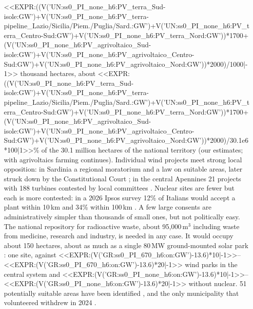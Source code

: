 <<EXPR:((V('UN:ss0_PI_none_h6:PV_terra_Sud-isole:GW')+V('UN:ss0_PI_none_h6:PV_terra-pipeline_Lazio/Sicilia/Piem./Puglia/Sard.:GW')+V('UN:ss0_PI_none_h6:PV_terra_Centro-Sud:GW')+V('UN:ss0_PI_none_h6:PV_terra_Nord:GW'))*1700+(V('UN:ss0_PI_none_h6:PV_agrivoltaico_Sud-isole:GW')+V('UN:ss0_PI_none_h6:PV_agrivoltaico_Centro-Sud:GW')+V('UN:ss0_PI_none_h6:PV_agrivoltaico_Nord:GW'))*2000)/1000|-1>> thousand hectares, about <<EXPR:((V('UN:ss0_PI_none_h6:PV_terra_Sud-isole:GW')+V('UN:ss0_PI_none_h6:PV_terra-pipeline_Lazio/Sicilia/Piem./Puglia/Sard.:GW')+V('UN:ss0_PI_none_h6:PV_terra_Centro-Sud:GW')+V('UN:ss0_PI_none_h6:PV_terra_Nord:GW'))*1700+(V('UN:ss0_PI_none_h6:PV_agrivoltaico_Sud-isole:GW')+V('UN:ss0_PI_none_h6:PV_agrivoltaico_Centro-Sud:GW')+V('UN:ss0_PI_none_h6:PV_agrivoltaico_Nord:GW'))*2000)/30.1e6*100|1>>\% of the 30.1 million hectares of the national territory (our estimates; with agrivoltaics farming continues). Individual wind projects meet strong local opposition: in Sardinia a regional moratorium and a law on suitable areas, later struck down by the Constitutional Court \citep{Sardegna2024,Consulta2026}; in the central Apennines 21 projects with 188 turbines contested by local committees \citep{Appennino2025}. Nuclear sites are fewer but each is more contested: in a 2026 Ipsos survey 12\% of Italians would accept a plant within 10\,km and 34\% within 100\,km \citep{Ipsos2026}. A few large consents are administratively simpler than thousands of small ones, but not politically easy. The national repository for radioactive waste, about 95{,}000\,m$^3$ including waste from medicine, research and industry, is needed in any case. It would occupy about 150 hectares, about as much as a single 80\,MW ground-mounted solar park \citep{Deposito2023}: one site, against <<EXPR:(V('GR:ss0_PI_670_h6:on:GW')-13.6)*10|-1>>--<<EXPR:(V('GR:ss0_PI_670_h6:on:GW')-13.6)*20|-1>> wind parks in the central system and <<EXPR:(V('GR:ss0_PI_none_h6:on:GW')-13.6)*10|-1>>--<<EXPR:(V('GR:ss0_PI_none_h6:on:GW')-13.6)*20|-1>> without nuclear. 51 potentially suitable areas have been identified \citep{Deposito2023}, and the only municipality that volunteered withdrew in 2024 \citep{Trino2024}.

